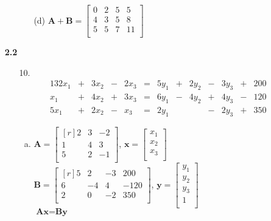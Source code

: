 \documentclass[letterpaper,fleqn]{article}
\begin{document}
\begin{enumerate}
\begin{enumerate}
\begin{enumerate}
				\item [(d)]
				$\textbf{A}+\textbf{B}=\begin{bmatrix*}
					0 & 2 & 5 & 5 \\
					4 & 3 & 5 & 8 \\
					5 & 5 & 7 & 11 \\
				\end{bmatrix*}$
			\end{enumerate}
		\end{enumerate}
		
		\item [\textbf{2.2}] \quad
		\begin{enumerate}
			\item [10.]
			\begin{alignat*}{13}
				2x_1 & {}+{} & 3x_2 & {}-{} & 2x_3 & {}={} 
				& 5y_1 & {}+{} & 2y_2 & {}-{} & 3y_3 & {}+{} & 200 \\
				 x_1 & {}+{} & 4x_2 & {}+{} & 3x_3 & {}={} 
				& 6y_1 & {}-{} & 4y_2 & {}+{} & 4y_3 & {}-{} & 120 \\
				5x_1 & {}+{} & 2x_2 & {}-{} &  x_3 
				& {}={} & 2y_1 & {} {} &      & {}-{} & 2y_3 & {}+{} & 350
			\end{alignat*}
			\begin{enumerate}[(a)]
				\item 
				$\textbf{A}=\begin{bmatrix*}[r]
					2 & 3 & -2 \\
					1 & 4 & 3 \\
					5 & 2 & -1 \\
				\end{bmatrix*}$, $\textbf{x}=\begin{bmatrix*}
					x_1 \\
					x_2 \\
					x_3 \\
				\end{bmatrix*}$ \\
				$\textbf{B}=\begin{bmatrix*}[r]
					5 & 2 & -3 & 200 \\
					6 & -4 & 4 & -120 \\
					2 & 0 & -2 & 350 \\
				\end{bmatrix*}$, $\textbf{y}=\begin{bmatrix*}
					y_1 \\
					y_2 \\
					y_3 \\
					1 \\
				\end{bmatrix*}$ \\
				$\textbf{Ax}=\textbf{By}$
				

\end{enumerate}
\end{enumerate}
\end{enumerate}
\end{document}
